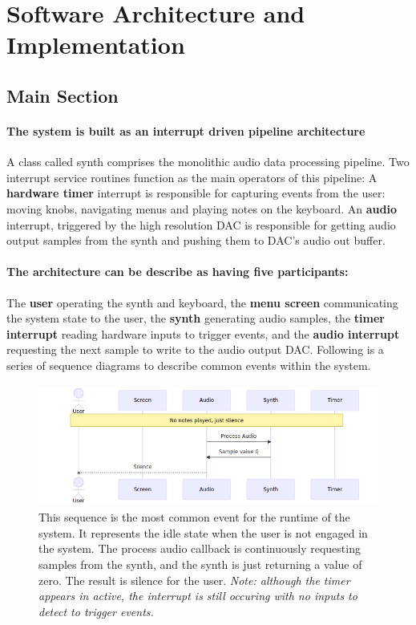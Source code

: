 \documentclass[acmlarge,screen]{acmart}
\begin{document}
\section{Software Architecture and Implementation}

\subsection{Main Section}
	\paragraph{The system is built as an interrupt driven pipeline architecture} A class called synth comprises the monolithic audio data processing pipeline. Two interrupt service routines function as the main operators of this pipeline: A \textbf{hardware timer} interrupt is responsible for capturing events from the user: moving knobs, navigating menus and playing notes on the keyboard. An \textbf{audio} interrupt, triggered by the high resolution DAC is responsible for getting audio output samples from the synth and pushing them to DAC's audio out buffer.
	
	\paragraph{The architecture can be describe as having five participants:} The \textbf{user} operating the synth and keyboard, the \textbf{menu screen} communicating the system state to the user, the \textbf{synth} generating audio samples, the \textbf{timer interrupt} reading hardware inputs to trigger events, and the \textbf{audio interrupt} requesting the next sample to write to the audio output DAC. Following is a series of sequence diagrams to describe common events within the system.
	
	\begin{figure}[H]
		\centering
		\caption{This sequence is the most common event for the runtime of the system. It represents the idle state when the user is not engaged in the system. The process audio callback is continuously requesting samples from the synth, and the synth is just returning a value of zero. The result is silence for the user. \textit{Note: although the timer appears in active, the interrupt is still occuring with no inputs to detect to trigger events.}}
		\includegraphics[height=4cm]{no_note_sequence}
	\end{figure}
\end{document}
